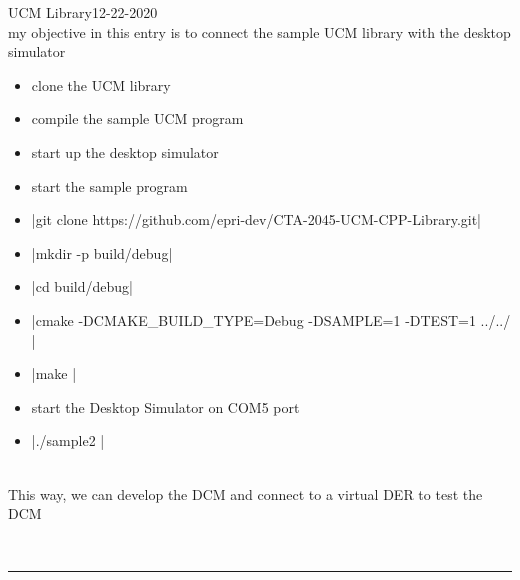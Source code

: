 \begin{entry}{UCM Library}{12-22-2020}
    \objective \\
    my objective in this entry is to connect the sample UCM library with the desktop simulator

    \outline
    \begin{itemize}
        \item clone the UCM library
        \item compile the sample UCM program
        \item start up the desktop simulator
        \item start the sample program
    \end{itemize}
    \procedures
    \begin{itemize}
        \item {}|git clone https://github.com/epri-dev/CTA-2045-UCM-CPP-Library.git|
        \item {}|mkdir -p build/debug|
        \item {}|cd build/debug|
        \item {}|cmake -DCMAKE_BUILD_TYPE=Debug -DSAMPLE=1 -DTEST=1 ../../ |
        \item {}|make |
        \item start the Desktop Simulator on COM5 port
        \item {}|./sample2 |
    \end{itemize}
    \results\\
    This way, we can develop the DCM and connect to a virtual DER to test the DCM
\end{entry}
\\\noindent\rule{\textwidth}{1pt}
